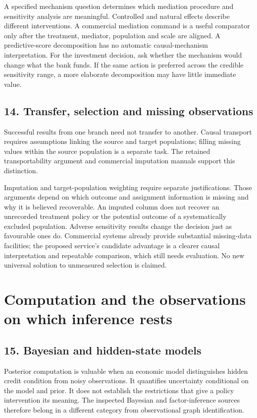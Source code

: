 A specified mechanism question determines which mediation procedure and
sensitivity analysis are meaningful. Controlled and natural effects describe
different interventions. A commercial mediation command is a useful
comparator only after the treatment, mediator, population and scale are aligned.
\citep{exec13_ci_stata_mediate,exec20_med_stata_multiple}
A predictive-score decomposition has no automatic causal-mechanism interpretation.
For the investment decision, ask whether the mechanism would change what the
bank funds. If the same action is preferred across the credible sensitivity
range, a more elaborate decomposition may have little immediate value.

\subsection{14. Transfer, selection and missing observations}
Successful results from one branch need not transfer to another. Causal
transport requires assumptions linking the source and target populations;
filling missing values within the source population is a separate task.
The retained transportability argument and commercial imputation manuals
support this distinction.
\citep{pearltransport2014,exec21_transport_stata_mi,
exec21_transport_sas_mi_intro,exec21_transport_sas_mianalyze_intro}

Imputation and target-population weighting require separate justifications.
Those arguments depend on which outcome and assignment information is
missing and why it is believed recoverable. An imputed column does not recover
an unrecorded treatment policy or the potential outcome of a systematically
excluded population. Adverse sensitivity results change the decision just as favourable ones do.
Commercial systems
already provide substantial missing-data facilities; the proposed service's
candidate advantage is a clearer causal interpretation and repeatable
comparison, which still needs evaluation. No new universal solution to
unmeasured selection is claimed.

\section{Computation and the observations on which inference rests}

\subsection{15. Bayesian and hidden-state models}
Posterior computation is valuable when an economic model distinguishes hidden
credit condition from noisy observations. It quantifies uncertainty conditional
on the model and prior. It does not establish the restrictions that give a
policy intervention its meaning. The inspected Bayesian and factor-inference
sources therefore belong in a different category from observational graph
identification.
\citep{exec23_pymc_sources,exec25_bsw_stan,exec24_libdai_source,
exec22_state_stata_bayesmh,exec22_state_stata_sspace_post}

